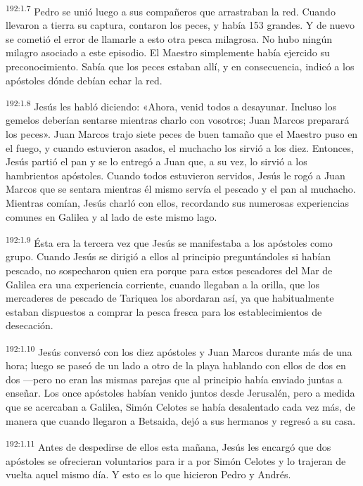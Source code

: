 \par 
\textsuperscript{192:1.7} Pedro se unió luego a sus compañeros que arrastraban la red. Cuando llevaron a tierra su captura, contaron los peces, y había 153 grandes. Y de nuevo se cometió el error de llamarle a esto otra pesca milagrosa. No hubo ningún milagro asociado a este episodio. El Maestro simplemente había ejercido su preconocimiento. Sabía que los peces estaban allí, y en consecuencia, indicó a los apóstoles dónde debían echar la red.

\par 
\textsuperscript{192:1.8} Jesús les habló diciendo: «Ahora, venid todos a desayunar. Incluso los gemelos deberían sentarse mientras charlo con vosotros; Juan Marcos preparará los peces». Juan Marcos trajo siete peces de buen tamaño que el Maestro puso en el fuego, y cuando estuvieron asados, el muchacho los sirvió a los diez. Entonces, Jesús partió el pan y se lo entregó a Juan que, a su vez, lo sirvió a los hambrientos apóstoles. Cuando todos estuvieron servidos, Jesús le rogó a Juan Marcos que se sentara mientras él mismo servía el pescado y el pan al muchacho. Mientras comían, Jesús charló con ellos, recordando sus numerosas experiencias comunes en Galilea y al lado de este mismo lago.

\par 
\textsuperscript{192:1.9} Ésta era la tercera vez que Jesús se manifestaba a los apóstoles como grupo. Cuando Jesús se dirigió a ellos al principio preguntándoles si habían pescado, no sospecharon quien era porque para estos pescadores del Mar de Galilea era una experiencia corriente, cuando llegaban a la orilla, que los mercaderes de pescado de Tariquea los abordaran así, ya que habitualmente estaban dispuestos a comprar la pesca fresca para los establecimientos de desecación.

\par 
\textsuperscript{192:1.10} Jesús conversó con los diez apóstoles y Juan Marcos durante más de una hora; luego se paseó de un lado a otro de la playa hablando con ellos de dos en dos ---pero no eran las mismas parejas que al principio había enviado juntas a enseñar. Los once apóstoles habían venido juntos desde Jerusalén, pero a medida que se acercaban a Galilea, Simón Celotes se había desalentado cada vez más, de manera que cuando llegaron a Betsaida, dejó a sus hermanos y regresó a su casa.

\par 
\textsuperscript{192:1.11} Antes de despedirse de ellos esta mañana, Jesús les encargó que dos apóstoles se ofrecieran voluntarios para ir a por Simón Celotes y lo trajeran de vuelta aquel mismo día. Y esto es lo que hicieron Pedro y Andrés.

